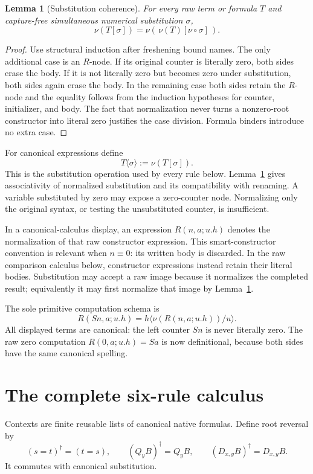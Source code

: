 \documentclass[11pt]{article}
\newtheorem{lemma}[theorem]{Lemma}
\theoremstyle{definition}
\newcommand{\norm}[1]{\nu(#1)}
\newcommand{\subc}[2]{#1\langle #2\rangle}
\newcommand{\lit}{\mathrel{\equiv}}
\begin{document}
\begin{lemma}[Substitution coherence]\label{cr:coherence}
For every raw term or formula \(T\) and capture-free simultaneous numerical substitution \(\sigma\),
\[
\norm{T[\sigma]}=
\norm{\,\norm T[\nu\circ\sigma]\,}.
\]
\end{lemma}
\begin{proof}
Use structural induction after freshening bound names. The only additional case is an \(R\)-node. If its original counter is literally zero, both sides erase the body. If it is not literally zero but becomes zero under substitution, both sides again erase the body. In the remaining case both sides retain the \(R\)-node and the equality follows from the induction hypotheses for counter, initializer, and body. The fact that normalization never turns a nonzero-root constructor into literal zero justifies the case division. Formula binders introduce no extra case.
\end{proof}

For canonical expressions define
\[
\subc T\sigma:=\norm{T[\sigma]}.
\]
This is the substitution operation used by every rule below. Lemma~\ref{cr:coherence} gives associativity of normalized substitution and its compatibility with renaming. A variable substituted by zero may expose a zero-counter node. Normalizing only the original syntax, or testing the unsubstituted counter, is insufficient.

In a canonical-calculus display, an expression \(R(n,a;u.h)\) denotes the normalization of that raw constructor expression. This smart-constructor convention is relevant when \(n\lit0\): its written body is discarded. In the raw comparison calculus below, constructor expressions instead retain their literal bodies. Substitution may accept a raw image because it normalizes the completed result; equivalently it may first normalize that image by Lemma~\ref{cr:coherence}.

The sole primitive computation schema is
\[
R(Sn,a;u.h)=\subc h{\norm{R(n,a;u.h)}/u}.
\tag{\(R_+\)}\label{cr:rplus}
\]
All displayed terms are canonical: the left counter \(Sn\) is never literally zero. The raw zero computation
\(R(0,a;u.h)=Sa\) is now definitional, because both sides have the same canonical spelling.

\section{The complete six-rule calculus}

Contexts are finite reusable lists of canonical native formulas. Define root reversal by
\[
(s=t)^\dagger=(t=s),\qquad
(Q_yB)^\dagger=Q_yB,\qquad
(D_{x,y}B)^\dagger=D_{x,y}B.
\]
It commutes with canonical substitution.
\end{document}

